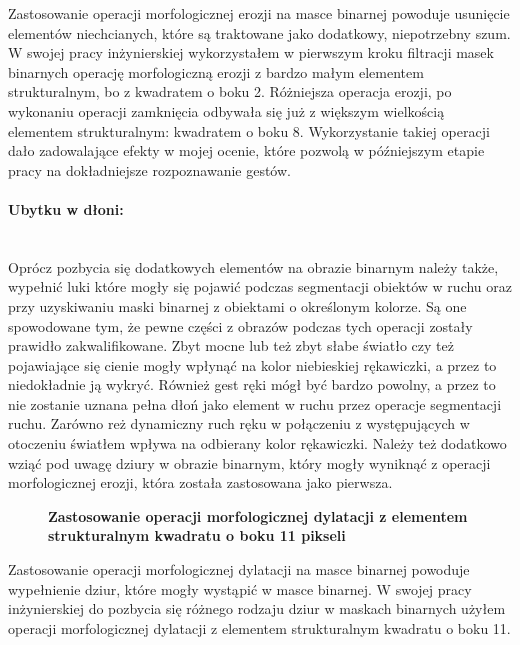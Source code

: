 \documentclass[a4paper,12pt,twoside,openany]{report}
\newcommand{\ImgPath}{.}
\begin{document}
Zastosowanie operacji morfologicznej erozji na masce binarnej powoduje usunięcie elementów niechcianych, które są traktowane jako dodatkowy, niepotrzebny szum. W swojej pracy inżynierskiej wykorzystałem w pierwszym kroku filtracji masek binarnych operację morfologiczną erozji z bardzo małym elementem strukturalnym, bo z kwadratem o boku 2. Różniejsza operacja erozji, po wykonaniu operacji zamknięcia odbywała się już z większym wielkością elementem strukturalnym: kwadratem o boku 8.  Wykorzystanie takiej operacji dało zadowalające efekty w mojej ocenie, które pozwolą w późniejszym etapie pracy na dokładniejsze rozpoznawanie gestów.

\paragraph{Ubytku w dłoni:} \mbox{} \\
Oprócz pozbycia się dodatkowych elementów na obrazie binarnym należy także, wypełnić luki które mogły się pojawić podczas segmentacji obiektów w ruchu oraz przy uzyskiwaniu maski binarnej z obiektami o określonym kolorze. Są one spowodowane tym, że pewne części z obrazów podczas tych operacji zostały prawidło zakwalifikowane. Zbyt mocne lub też zbyt słabe światło czy też pojawiające się cienie mogły wpłynąć na kolor niebieskiej rękawiczki, a przez to niedokładnie ją wykryć. Również gest ręki mógł być bardzo powolny, a przez to nie zostanie uznana pełna dłoń jako element w ruchu przez operacje segmentacji ruchu. Zarówno reż dynamiczny ruch ręku w połączeniu z występujących w otoczeniu światłem wpływa na odbierany kolor rękawiczki. Należy też dodatkowo wziąć pod uwagę dziury w obrazie binarnym, który mogły wyniknąć z operacji morfologicznej erozji, która została zastosowana jako pierwsza. 

\begin{figure}[H]
	\centering
	\caption{  \textbf{Zastosowanie operacji morfologicznej dylatacji z elementem strukturalnym kwadratu o boku 11 pikseli}}
\end{figure}

Zastosowanie operacji morfologicznej dylatacji na masce binarnej powoduje wypełnienie dziur, które mogły wystąpić w masce binarnej. W swojej pracy inżynierskiej do pozbycia się różnego rodzaju dziur w maskach binarnych  użyłem operacji morfologicznej dylatacji z elementem strukturalnym kwadratu o boku 11. 
\end{document}
